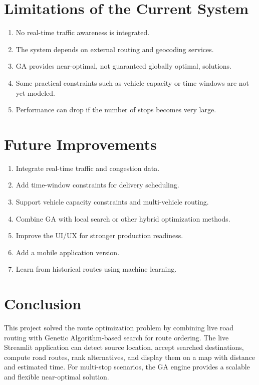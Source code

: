 \section{Limitations of the Current System}
\begin{enumerate}[leftmargin=1.5em]
    \item No real-time traffic awareness is integrated.
    \item The system depends on external routing and geocoding services.
    \item GA provides near-optimal, not guaranteed globally optimal, solutions.
    \item Some practical constraints such as vehicle capacity or time windows are not yet modeled.
    \item Performance can drop if the number of stops becomes very large.
\end{enumerate}

\section{Future Improvements}
\begin{enumerate}[leftmargin=1.5em]
    \item Integrate real-time traffic and congestion data.
    \item Add time-window constraints for delivery scheduling.
    \item Support vehicle capacity constraints and multi-vehicle routing.
    \item Combine GA with local search or other hybrid optimization methods.
    \item Improve the UI/UX for stronger production readiness.
    \item Add a mobile application version.
    \item Learn from historical routes using machine learning.
\end{enumerate}

\section{Conclusion}
This project solved the route optimization problem by combining live road routing with Genetic Algorithm-based search for route ordering. The live Streamlit application can detect source location, accept searched destinations, compute road routes, rank alternatives, and display them on a map with distance and estimated time. For multi-stop scenarios, the GA engine provides a scalable and flexible near-optimal solution.

